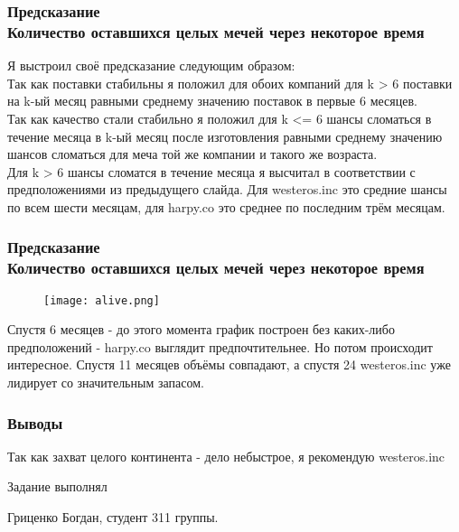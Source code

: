 \documentclass[8pt]{beamer}
\begin{document}
\begin{frame}
\frametitle{Предсказание\\ {\small Количество оставшихся целых мечей через некоторое время}}
Я выстроил своё предсказание следующим образом:\\
Так как поставки стабильны я положил для обоих компаний для k > 6 поставки на k-ый месяц равными среднему значению поставок в первые 6 месяцев.\\
Так как качество стали стабильно я положил для k <= 6 шансы сломаться в течение месяца в k-ый месяц после изготовления равными среднему значению шансов сломаться для меча той же компании и такого же возраста.\\
Для k > 6 шансы сломатся в течение месяца я высчитал в соответствии с предположениями из предыдущего слайда. Для westeros.inc это средние шансы по всем шести месяцам, для harpy.co это среднее по последним трём месяцам.
\end{frame}

\begin{frame}
\frametitle{Предсказание\\ {\small Количество оставшихся целых мечей через некоторое время}}

\begin{figure}[h]
		\texttt{[image: alive.png]}
\end{figure}
Спустя 6 месяцев - до этого момента график построен без каких-либо предположений - harpy.co выглядит предпочтительнее. Но потом происходит интересное. Спустя 11 месяцев объёмы совпадают, а спустя 24 westeros.inc уже лидирует со значительным запасом.
\end{frame}

\begin{frame}
\frametitle{Выводы}
Так как захват целого континента - дело небыстрое, я рекомендую westeros.inc
\end{frame}

\begin{frame}{Задание выполнял}
	\begin{itemize}
		{\small
		\item Гриценко Богдан, студент 311 группы.}
	\end{itemize}	

\end{frame}
\end{document}
